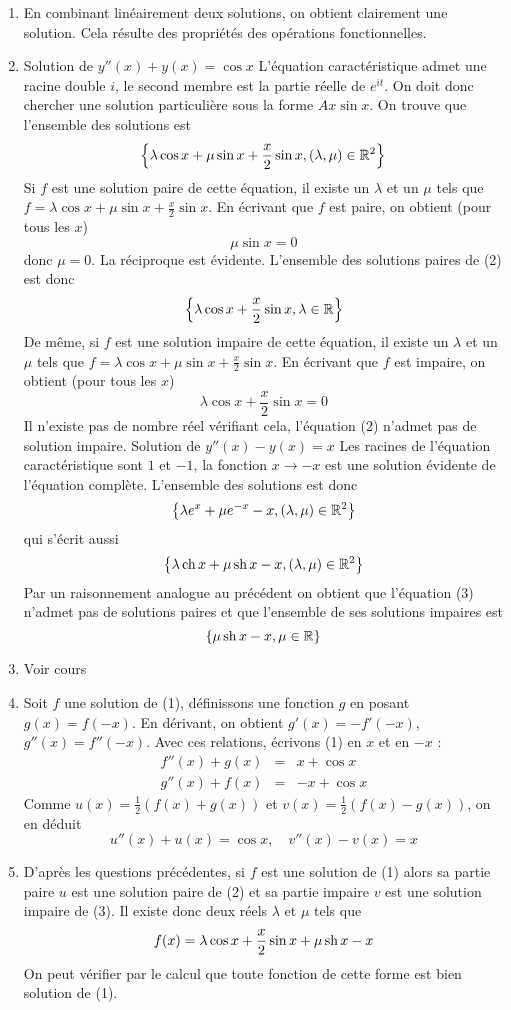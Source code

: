 \begin{enumerate}
\item En combinant linéairement deux solutions, on obtient clairement une solution. Cela résulte des propriétés des opérations fonctionnelles.
\item Solution de $y''(x)+y(x)=\cos x $\newline
L'équation caractéristique admet une racine double $i$, le second membre est la partie réelle de $e^{it}$. On doit donc chercher une solution particulière sous la forme $Ax\sin x$. On trouve que l'ensemble des solutions est
\[\left\lbrace  \lambda \cos x +\mu \sin x + \frac{x}{2}\sin x, (\lambda,\mu)\in \mathbb{R}^2\right\rbrace \]
Si $f$ est une solution paire de cette équation, il existe un $\lambda$ et un $\mu$ tels que $f=\lambda \cos x +\mu \sin x + \frac{x}{2}\sin x$. En écrivant que $f$ est paire, on obtient (pour tous les $x$)
\[\mu \sin x =0\]
donc $\mu=0$. La réciproque est évidente. L'ensemble des solutions paires de (2) est donc
\[\left\lbrace  \lambda \cos x + \frac{x}{2}\sin x, \lambda\in \mathbb{R}\right\rbrace \]
De même, si $f$ est une solution impaire de cette équation, il existe un $\lambda$ et un $\mu$ tels que $f=\lambda \cos x +\mu \sin x + \frac{x}{2}\sin x$. En écrivant que $f$ est impaire, on obtient (pour tous les $x$)
\[\lambda \cos x + \frac{x}{2}\sin x =0\]
Il n'existe pas de nombre réel vérifiant cela, l'équation (2) n'admet pas de solution impaire.\newline
Solution de $y''(x)-y(x)= x $\newline
Les racines de l'équation caractéristique sont $1$ et $-1$, la fonction $x\rightarrow -x$ est une solution évidente de l'équation complète. L'ensemble des solutions est donc
\[\left\lbrace  \lambda e^x +\mu e^{-x} -  x, (\lambda,\mu)\in \mathbb{R}^2\right\rbrace \]
qui s'écrit aussi
\[\left\lbrace  \lambda \operatorname{ch} x +\mu \operatorname{sh} x - x, (\lambda,\mu)\in \mathbb{R}^2\right\rbrace \]
Par un raisonnement analogue au précédent on obtient que l'équation (3) n'admet pas de solutions paires et que l'ensemble de ses solutions impaires est
\[\left\lbrace  \mu \operatorname{sh} x -  x, \mu\in \mathbb{R} \right\rbrace \]

\item Voir cours

\item Soit $f$ une solution de (1), définissons une fonction $g$ en posant $g(x)=f(-x)$. En dérivant, on obtient $g'(x)=-f'(-x)$, $g''(x)=f''(-x)$. Avec ces relations, écrivons (1) en $x$ et en $-x$ :
\begin{eqnarray*}
f''(x) + g(x) & = & x+\cos x \\
g''(x) + f(x) & = & -x+\cos x
\end{eqnarray*}
Comme $u(x)=\frac{1}{2}(f(x)+g(x))$ et $v(x)=\frac{1}{2}(f(x)-g(x))$, on en déduit
\[u''(x)+u(x)=\cos x , \quad v''(x)-v(x)=x\]

\item D'après les questions précédentes, si $f$ est une solution de (1) alors sa partie paire $u$ est une solution paire de (2) et sa partie impaire $v$ est une solution impaire de (3). Il existe donc deux réels $\lambda$ et $\mu$ tels que
\[f(x)=\lambda \cos x +\frac{x}{2}\sin x +\mu \operatorname{sh} x -x\]
On peut vérifier par le calcul que toute fonction de cette forme est bien solution de (1).
\end{enumerate}
